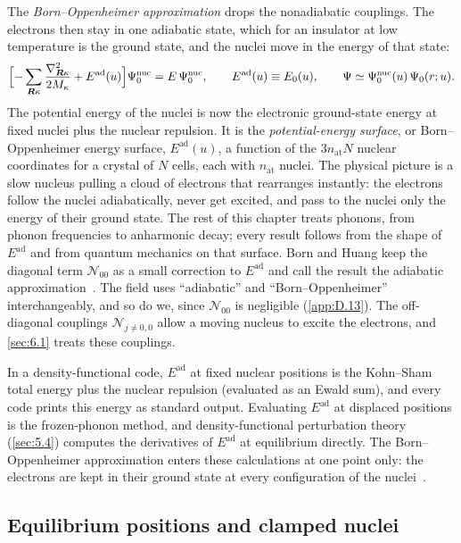 The \emph{Born--Oppenheimer approximation} drops the nonadiabatic couplings. The electrons then stay in one adiabatic state, which for an insulator at low temperature is the ground state, and the nuclei move in the energy of that state:
\begin{equation}
  \Bigl[-\sum_{\bm{R}\kappa}\frac{\nabla_{\bm{R}\kappa}^2}{2M_\kappa} + E^{\mathrm{ad}}(u)\Bigr]\Psi^{\mathrm{nuc}}_0 = E\,\Psi^{\mathrm{nuc}}_0 , \qquad
  E^{\mathrm{ad}}(u) \equiv E_0(u) , \qquad
  \Psi \simeq \Psi^{\mathrm{nuc}}_0(u)\,\Psi_0(r;u) .
  \label{eq:5.1-BO}
\end{equation}
The potential energy of the nuclei is now the electronic ground-state energy at fixed nuclei plus the nuclear repulsion. It is the \emph{potential-energy surface}, or Born--Oppenheimer energy surface, $E^{\mathrm{ad}}(u)$, a function of the $3n_{\mathrm{at}}N$ nuclear coordinates for a crystal of $N$ cells, each with $n_{\mathrm{at}}$ nuclei. The physical picture is a slow nucleus pulling a cloud of electrons that rearranges instantly: the electrons follow the nuclei adiabatically, never get excited, and pass to the nuclei only the energy of their ground state. The rest of this chapter treats phonons, from phonon frequencies to anharmonic decay; every result follows from the shape of $E^{\mathrm{ad}}$ and from quantum mechanics on that surface. Born and Huang keep the diagonal term $\mathcal{N}_{00}$ as a small correction to $E^{\mathrm{ad}}$ and call the result the adiabatic approximation~\cite[App.~VIII]{born1954dynamical}. The field uses ``adiabatic'' and ``Born--Oppenheimer'' interchangeably, and so do we, since $\mathcal{N}_{00}$ is negligible (\cref{app:D.13}). The off-diagonal couplings $\mathcal{N}_{j\ne0,0}$ allow a moving nucleus to excite the electrons, and \cref{sec:6.1} treats these couplings.

In a density-functional code, $E^{\mathrm{ad}}$ at fixed nuclear positions is the Kohn--Sham total energy plus the nuclear repulsion (evaluated as an Ewald sum), and every code prints this energy as standard output. Evaluating $E^{\mathrm{ad}}$ at displaced positions is the frozen-phonon method, and density-functional perturbation theory (\cref{sec:5.4}) computes the derivatives of $E^{\mathrm{ad}}$ at equilibrium directly. The Born--Oppenheimer approximation enters these calculations at one point only: the electrons are kept in their ground state at every configuration of the nuclei~\cite[Sect.~III\,A]{giustino2017electron}.

\subsection{Equilibrium positions and clamped nuclei}

